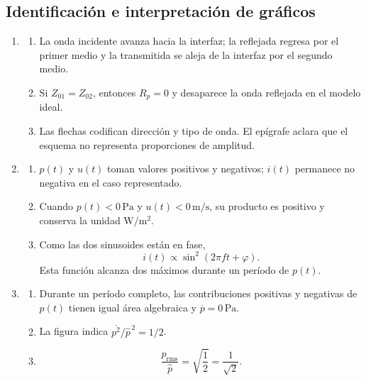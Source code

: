 \subsection*{Identificación e interpretación de gráficos}

\begin{enumerate}[label=\textbf{R\arabic*.},leftmargin=*]
    \item
    \begin{enumerate}[label=\alph*)]
        \item La onda incidente avanza hacia la interfaz; la reflejada regresa
        por el primer medio y la transmitida se aleja de la interfaz por el
        segundo medio.
        \item Si \(Z_{01}=Z_{02}\), entonces \(R_p=0\) y desaparece la onda
        reflejada en el modelo ideal.
        \item Las flechas codifican dirección y tipo de onda. El epígrafe
        aclara que el esquema no representa proporciones de amplitud.
    \end{enumerate}

    \item
    \begin{enumerate}[label=\alph*)]
        \item \(p(t)\) y \(u(t)\) toman valores positivos y negativos;
        \(i(t)\) permanece no negativa en el caso representado.
        \item Cuando \(p(t)<0\,\text{Pa}\) y
        \(u(t)<0\,\text{m}/\text{s}\), su producto es positivo y conserva la
        unidad \(\text{W}/\text{m}^2\).
        \item Como las dos sinusoides están en fase,
        \[
            i(t)\propto\sin^2(2\pi ft+\varphi).
        \]
        Esta función alcanza dos máximos durante un período de \(p(t)\).
    \end{enumerate}

    \item
    \begin{enumerate}[label=\alph*)]
        \item Durante un período completo, las contribuciones positivas y
        negativas de \(p(t)\) tienen igual área algebraica y
        \(\overline p=0\,\text{Pa}\).
        \item La figura indica
        \(\overline{p^2}/\hat p^{\,2}=1/2\).
        \item
        \[
            \frac{p_\mathrm{rms}}{\hat p}
              =\sqrt{\frac{1}{2}}
              =\frac{1}{\sqrt{2}}.
        \]
    \end{enumerate}


\end{enumerate}
